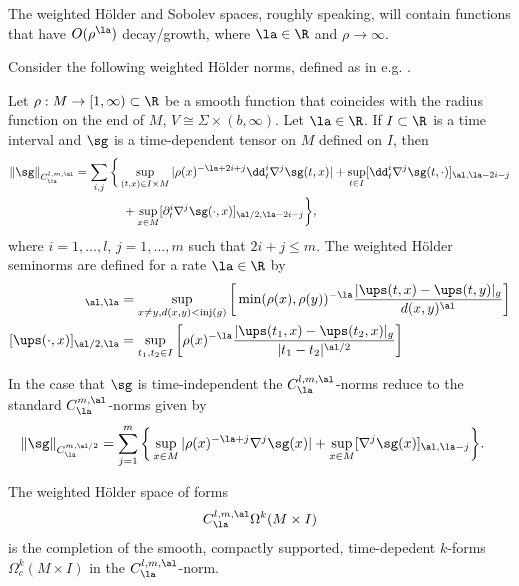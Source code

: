 \documentclass[hidelinks, 12pt, oneside, reqno]{amsart}
\begin{document}
The weighted H\"older and Sobolev spaces, roughly speaking, will contain functions that have $O(\rho^\la)$ decay/growth, where $\la \in \R$ and $\rho \rightarrow \infty$.

Consider the following weighted H\"older norms, defined as in e.g. \cite[\S 7]{LMCFwithsings}. 

\begin{defn}\label{definition weighted parabolic holder norms}
    Let $\rho : M \rightarrow [1, \infty) \subset \R$ be a smooth function that coincides with the radius function on the end of $M$, $V \cong \Sigma \times (b, \infty)$. Let $\la \in \R$. If $I\subset \R$ is a time interval and $\sg$ is a time-dependent tensor on $M$ defined on $I$, then
    \begin{align}\label{equation weighted holder definition}
        \|\sg\|_{C^{l,m,\al}_{\la}} &= \sum_{i,j} \bigg\{ \sup_{(t,x) \in I \times M} |\rho(x)^{-\la + 2i + j}\dd_t^i \nabla^j \sg(t,x)| + \sup_{t \in I} [\dd_t^i \nabla^j \sg(t, \cdot)]_{\al, \la -2i -j}\nonumber \\
        &\qquad \qquad + \sup_{x \in M} [\partial_t^i \nabla^j \sg(\cdot, x)]_{\al/2, \la - 2i -j}\bigg\},
    \end{align}
    where $i = 1,\ldots, l$, $j = 1, \ldots, m$ such that $2i + j \le m$. The weighted H\"older seminorms are defined for a rate $\la \in \R$ by
    \begin{align*}
        [\ups(t,\cdot)]_{\al, \la} &= \sup_{x \ne y, d(x,y) < \mathrm{inj}(g)} \bigg[ \min(\rho(x),\rho(y))^{-\la} \frac{|\ups(t,x) - \ups(t,y)|_g}{d(x,y)^\al} \bigg] \\
         [\ups(\cdot,x)]_{\al/2, \la} &= \sup_{t_1,t_2 \in I} \bigg[ \rho(x)^{-\la} \frac{|\ups(t_1,x) - \ups(t_2,x)|_g}{|t_1-t_2|^{\al/2}} \bigg]
    \end{align*}
\end{defn}

\begin{rmk}
    In the case that $\sg$ is time-independent the $C^{l,m,\al}_{\la}$-norms reduce to the standard $C^{m,\al}_{\la}$-norms given by
    \begin{align}\label{equation weighted static holder definition}
        \|\sg\|_{C^{m,\al/2}_{\la}} &= \sum_{j=1}^m \bigg\{ \sup_{x \in M} |\rho(x)^{-\la +  j} \nabla^j \sg(x)| + \sup_{x \in M} [\nabla^j \sg(x)]_{\al, \la -j}\bigg\}.
    \end{align}
\end{rmk}

\begin{defn}\label{definition weighted holder space of forms}
The weighted H\"older space of forms
\[
C^{l,m,\al}_{\la}\Omega^k(M \times I) 
\]
is the completion of the smooth, compactly supported, time-depedent $k$-forms $\Omega^k_c(M \times I)$ in the $C^{l,m,\al}_\la$-norm. 
\end{defn}
\end{document}
